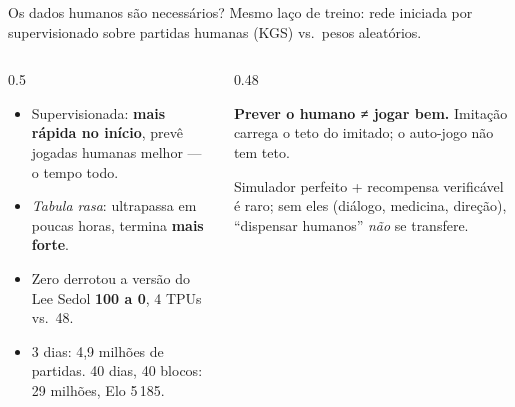 \documentclass[aspectratio=169, 10pt]{beamer}
\begin{document}
\begin{frame}{Os dados humanos são necessários?}
  \footnotesize
  Mesmo laço de treino: rede iniciada por supervisionado sobre partidas humanas (KGS) vs.\ pesos aleatórios.

  \begin{columns}[T]
    \begin{column}{0.5\textwidth}
      \begin{itemize}
        \item Supervisionada: \textbf{mais rápida no início}, prevê jogadas humanas melhor — o tempo todo.
        \item \emph{Tabula rasa}: ultrapassa em poucas horas, termina \textbf{mais forte}.
        \item Zero derrotou a versão do Lee Sedol \textbf{100 a 0}, 4 TPUs vs.\ 48.
        \item 3 dias: 4,9 milhões de partidas. 40 dias, 40 blocos: 29 milhões, Elo 5\,185.
      \end{itemize}
    \end{column}
    \begin{column}{0.48\textwidth}
      \begin{alertabox}
        \textbf{Prever o humano ≠ jogar bem.} Imitação carrega o teto do imitado; o auto-jogo não tem teto.
      \end{alertabox}
      \begin{ideiabox}
        Simulador perfeito + recompensa verificável é raro; sem eles (diálogo, medicina, direção), ``dispensar humanos'' \emph{não} se transfere.
      \end{ideiabox}
    \end{column}
  \end{columns}
\end{frame}
\end{document}
